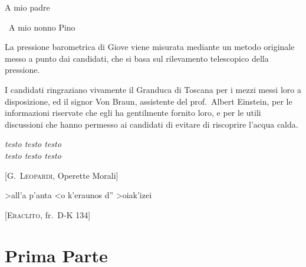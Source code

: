 \documentclass[%
    corpo=13pt,
    twoside,
    oldstyle,
    autoretitolo,
    greek,
    evenboxes,
]{toptesi}
\begin{document}
%
{\tomo
  \paginavuota
    \begin{dedica}
        A mio padre

        \textdagger\ A mio nonno Pino
    \end{dedica}
}{%
    \frontespizio %
}

\sommario

La pressione barometrica di Giove viene misurata
mediante un metodo originale  messo a punto dai candidati, che si basa
sul rilevamento telescopico della pressione.


\ringraziamenti

I candidati ringraziano vivamente il Granduca di Toscana per i mezzi
messi loro a disposizione, ed il signor Von Braun, assistente del
prof.~Albert Einstein, per le informazioni riservate che egli ha
gentilmente fornito loro, e per le utili discussioni che hanno permesso
ai candidati di evitare di riscoprire l'acqua calda.

\tablespagetrue\figurespagetrue %
\indici

\ifclassica   
\begin{citazioni}
        \textit{testo testo testo\\testo testo testo}

        [\textsc{G.\ Leopardi}, Operette Morali]\vspace{1em}

        \textgreek{>all'a p'anta <o k'eraunos d'' >oiak'izei}

        [\textsc{Eraclito}, fr.\ D-K 134]
    \end{citazioni}

\fi


\part{Prima Parte}
\end{document}
